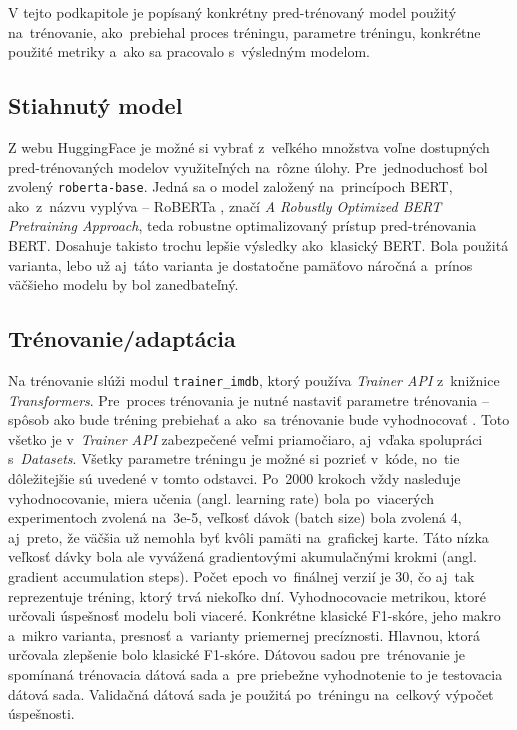 V tejto podkapitole je popísaný konkrétny pred-trénovaný model použitý na~trénovanie, ako~prebiehal proces tréningu, parametre tréningu, konkrétne použité metriky a~ako sa pracovalo s~výsledným modelom. 

\subsection*{Stiahnutý model}

Z webu HuggingFace je možné si vybrať z~veľkého množstva voľne dostupných pred-trénovaných modelov využiteľných na~rôzne úlohy. Pre~jednoduchosť bol zvolený {\tt roberta-base}. Jedná sa o model založený na~princípoch BERT, ako~z~názvu vyplýva -- RoBERTa \cite{Liu:2019}, značí \textit{A Robustly Optimized BERT Pretraining Approach}, teda robustne optimalizovaný prístup pred-trénovania BERT. Dosahuje takisto trochu lepšie výsledky ako~klasický BERT. Bola použitá  varianta, lebo už aj~táto varianta je dostatočne pamäťovo náročná a~prínos väčšieho modelu by bol zanedbateľný.

\subsection*{Trénovanie/adaptácia}

Na trénovanie slúži modul {\tt trainer\_imdb}, ktorý používa \textit{Trainer API} z~knižnice \textit{Transformers}. Pre~proces trénovania je nutné nastaviť parametre trénovania -- spôsob ako bude tréning prebiehať a ako~sa trénovanie bude vyhodnocovať . Toto všetko je v~\textit{Trainer API} zabezpečené veľmi priamočiaro, aj~vďaka spolupráci s~\textit{Datasets}. Všetky parametre tréningu je možné si pozrieť v~kóde, no~tie dôležitejšie sú uvedené v tomto odstavci. Po~2000 krokoch vždy nasleduje vyhodnocovanie, miera učenia (angl. learning rate) bola po~viacerých experimentoch zvolená na~3e-5, veľkosť dávok (batch size) bola zvolená 4, aj~preto, že väčšia už nemohla byť kvôli pamäti na~grafickej karte. Táto nízka veľkosť dávky bola ale vyvážená gradientovými akumulačnými krokmi (angl. gradient accumulation steps). Počet epoch vo~finálnej verzií je 30, čo aj~tak reprezentuje tréning, ktorý trvá niekoľko dní. Vyhodnocovacie metrikou, ktoré určovali úspešnosť modelu boli viaceré. Konkrétne klasické F1-skóre, jeho makro a~mikro varianta, presnosť a~varianty priemernej precíznosti. Hlavnou, ktorá určovala zlepšenie bolo klasické F1-skóre. Dátovou sadou pre~trénovanie je spomínaná trénovacia dátová sada a~pre priebežne vyhodnotenie to je testovacia dátová sada. Validačná dátová sada je použitá po~tréningu na~celkový výpočet úspešnosti. 

